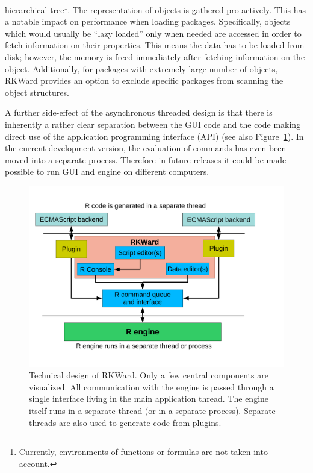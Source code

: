 hierarchical tree\footnote{
    Currently, environments of functions or formulas are not taken into account.
}. The representation of  objects is gathered
pro-actively. This has a notable impact on performance when loading packages.
Specifically, objects which would usually be ``lazy loaded'' only when needed \citep[see][]{Ripley2004} are
accessed in order to fetch information on their properties. This means the data
has to be loaded from disk; however, the memory is freed immediately after fetching
information on the object. Additionally, for packages with extremely large number of objects, RKWard
provides an option to exclude specific packages from scanning the object structures.

A further side-effect of the asynchronous threaded design is that there is
inherently a rather clear separation between the GUI code and the code making direct use
of the  application programming interface (API) (see also Figure~\ref{fig:design_sketch}). 
In the current development version, the evaluation
of  commands has even been moved into a separate process. Therefore in future releases it could 
be made possible to run GUI and  engine on different computers.

\begin{figure}[t!]
 \centering
 \includegraphics{../figures/design_sketch.pdf}
 \caption{Technical design of RKWard. Only a few central components are visualized.
 All communication with the  engine is passed through a single interface living in the main application thread. The  engine itself
 runs in a separate thread (or in a separate process). 
 Separate threads are also used to generate  code from plugins.
}
 \label{fig:design_sketch}
\end{figure}

